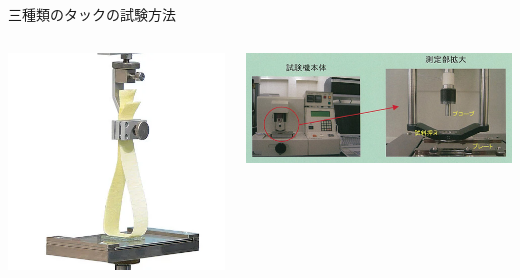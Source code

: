 \documentclass[unicode,12pt]{beamer}%
\begin{document}
\begin{frame}
\begin{block}{三種類のタックの試験方法}
\begin{columns}[c, onlytextwidth]
			\includegraphics[width=\textwidth]{rooptack.png}

			\includegraphics[width=\textwidth]{probtack_1.jpg}
		\end{columns}
	\end{block}
\end{frame}
\end{document}
